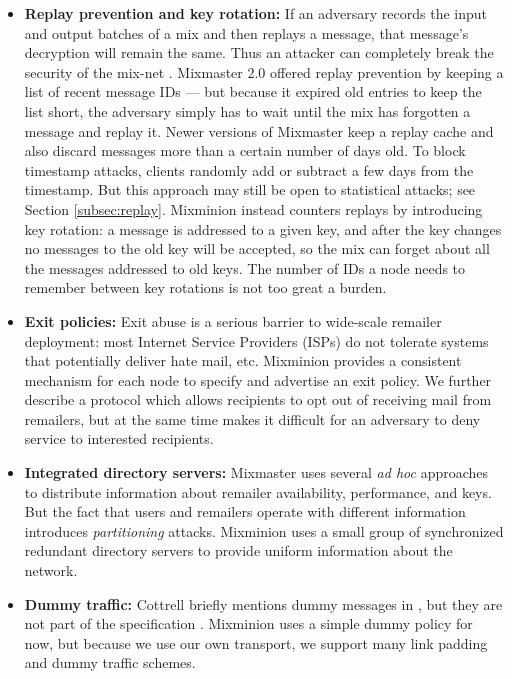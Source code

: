 \documentclass[final]{ieee}
\begin{document}
\begin{itemize}
\item \textbf{Replay prevention and key rotation:} If an adversary records
the input and output batches of a mix and then replays a message, that
message's decryption will remain the same. Thus an attacker can completely
break the security of the mix-net \cite{chaum-mix}. Mixmaster 2.0 offered
replay prevention by keeping a list of recent message IDs --- but because
it expired old entries to keep the list short, the adversary simply
has to wait until the mix has forgotten a message and replay it. Newer
versions of Mixmaster keep a replay cache and also discard messages more
than a certain number of days old. To block timestamp attacks, clients
randomly add or subtract a few days from the timestamp. But this approach
may still be open to statistical attacks; see Section \ref{subsec:replay}.
Mixminion instead counters replays by introducing
key rotation: a message is addressed to a given key, and after the key
changes no messages to the old key will be accepted, so the mix can forget
about all the messages addressed to old keys. The
number of IDs a node needs to remember between key rotations is not
too great a burden.

\item \textbf{Exit policies:} Exit abuse is a serious barrier to wide-scale
remailer deployment: most Internet Service Providers (ISPs) do not
tolerate systems that potentially 
deliver hate mail, etc.
Mixminion provides a consistent mechanism for each node to specify and
advertise an exit policy. We
further describe a protocol which allows recipients to opt out of receiving mail
from remailers, but at the same time makes it difficult for an adversary
to deny service to interested recipients.

\item \textbf{Integrated directory servers:} Mixmaster uses several \emph{ad hoc}
approaches to distribute information about remailer availability, performance, and
keys. But the fact that users and remailers operate with
different information introduces \emph{partitioning} attacks.
Mixminion
uses a small group of synchronized redundant directory servers
to provide uniform information about the network.

\item \textbf{Dummy traffic:} Cottrell briefly mentions dummy messages
in \cite{mixmaster-attacks}, but they are not part of the specification
\cite{mixmaster-spec}. Mixminion uses a simple dummy policy for now,
but because we use our own transport, we support many
link padding and dummy traffic schemes.

\end{itemize}
\end{document}
